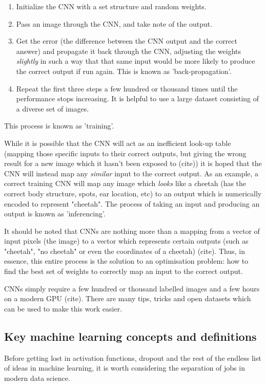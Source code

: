 \begin{enumerate}
\item Initialize the CNN with a set structure and random weights.
\item Pass an image through the CNN, and take note of the output.
\item Get the error (the difference between the CNN output and the correct answer) and propagate it back through the CNN, adjusting the weights \emph{slightly} in such a way that that same input would be more likely to produce the correct output if run again. This is known as 'back-propagation'.
\item Repeat the first three steps a few hundred or thousand times until the performance stops increasing. It is helpful to use a large dataset consisting of a diverse set of images.
\end{enumerate}

This process is known as 'training'.

While it is possible that the CNN will act as an inefficient look-up table (mapping those specific inputs to their correct outputs, but giving the wrong result for a new image which it hasn't been exposed to {\color{red} (cite)}) it is hoped that the CNN will instead map any \emph{similar} input to the correct output. As an example, a correct training CNN will map any image which \emph{looks} like a cheetah (has the correct body structure, spots, ear location, etc) to an output which is numerically encoded to represent "cheetah". The process of taking an input and producing an output is known as 'inferencing'.

It should be noted that CNNs are nothing more than a mapping from a vector of input pixels (the image) to a vector which represents certain outputs (such as "cheetah", "no cheetah" or even the coordinates of a cheetah) {\color{red} (cite)}. Thus, in essence, this entire process is the solution to an optimisation problem: how to find the best set of weights to correctly map an input to the correct output.

CNNs simply require a few hundred or thousand labelled images and a few hours on a modern GPU {\color{red} (cite)}. There are many tips, tricks and open datasets which can be used to make this work easier.

\subsection{Key machine learning concepts and definitions}
Before getting lost in activation functions, dropout and the rest of the endless list of ideas in machine learning, it is worth considering the separation of jobs in modern data science.

